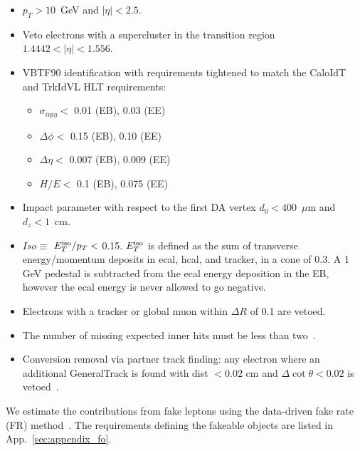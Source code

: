 \begin{itemize}

\item $p_{T}>10$~GeV and $|\eta| < 2.5$.

\item Veto electrons with a supercluster in the transition region $1.4442 < |\eta| < 1.556$.

\item VBTF90 identification\cite{ref:vbtf} with requirements tightened to match the CaloIdT and TrkIdVL HLT requirements:

  \begin{itemize}
  \item $\sigma_{i\eta i\eta} < $ 0.01 (EB), 0.03 (EE)
  \item $\Delta\phi < $ 0.15 (EB), 0.10 (EE)
  \item $\Delta\eta < $ 0.007 (EB), 0.009 (EE)
  \item $H/E < $ 0.1 (EB), 0.075 (EE)
  \end{itemize}  

\item Impact parameter with respect to the first DA vertex $d_0 < 400$~$\mu$m and $d_z < 1$~cm.

\item $Iso \equiv $ $E_T^{\rm iso}/p_T < $ 0.15.  $E_T^{\rm iso}$
is defined as the sum of transverse energy/momentum deposits in ecal,
hcal, and tracker, in a 
cone of 0.3.  A 1 GeV pedestal is subtracted from the ecal energy 
deposition in the EB, however the ecal energy is never allowed to 
go negative.

\item Electrons with a tracker or global muon within $\Delta R$ of 
0.1 are vetoed.

\item The number of missing expected inner hits must be less than 
two~\cite{ref:conv}.

\item Conversion removal via partner track finding: any electron
where an additional GeneralTrack is found with dist $< 0.02$ cm 
and $\Delta\cot\theta < 0.02$ is vetoed~\cite{ref:conv}.


\end{itemize}

We estimate the contributions from fake leptons using the data-driven
fake rate (FR) method~\cite{ref:FR}. The requirements defining the fakeable objects 
are listed in App.~\ref{sec:appendix_fo}.


